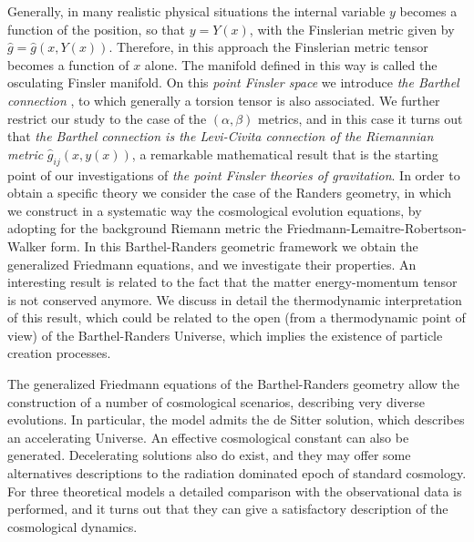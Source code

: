 \documentclass[aps,superscriptaddress, showpacs,preprintnumbers, superscriptaddress, nofootinbibt,twocolumn]{revtex4-2}
\begin{document}
Generally, in many  realistic physical situations the internal variable $y$ becomes a function of the position, so that $%
y=Y(x)$, with the Finslerian metric given by $\hat{g}=\hat{g}\left(
x,Y(x)\right) $. Therefore, in this approach the Finslerian metric tensor
becomes a function of $x$ alone. The manifold defined in this way is called
the osculating Finsler manifold. On this {\it point Finsler space} we introduce {\it the Barthel connection} \cite{Bar1,Bar2,Ing0}, to which generally a torsion tensor is also associated. We further restrict our study to the case of the $(\alpha, \beta)$ metrics, and in this case it turns out that {\it the Barthel connection is the Levi-Civita connection of the Riemannian metric} $\hat{g}_{ij}(x,y(x))$, a remarkable mathematical result that is the starting point of our investigations of {\it the point Finsler theories of gravitation}. In order to obtain a specific theory we consider the case of the Randers geometry, in which we construct in a systematic way the cosmological evolution equations, by adopting for the background Riemann metric the Friedmann-Lemaitre-Robertson-Walker form. In this Barthel-Randers geometric framework we obtain the generalized Friedmann equations, and we investigate their properties. An interesting result is related to the fact that the matter energy-momentum tensor is not conserved anymore. We discuss in detail the thermodynamic interpretation of this result, which could be related to the open (from a thermodynamic point of view) of the Barthel-Randers Universe, which implies the existence of particle creation processes.

The generalized Friedmann equations of the Barthel-Randers geometry allow the construction of a number of cosmological scenarios, describing very diverse evolutions. In particular, the model admits the de Sitter solution, which describes an accelerating Universe. An effective cosmological constant can also be generated. Decelerating solutions also do exist, and they may offer some alternatives descriptions to the radiation dominated epoch of standard cosmology. For three theoretical models a detailed comparison with the observational data is performed, and it turns out that they can give a satisfactory description of the cosmological dynamics.
\end{document}
